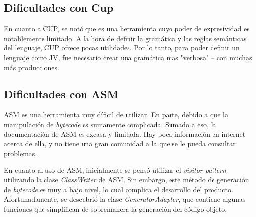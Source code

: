\documentclass{article}
\begin{document}
        \subsection{Dificultades con Cup}
            \par En cuanto a CUP, se notó que es una herramienta cuyo poder de expresividad es notablemente limitado. A la hora de definir la gramática y las reglas semánticas del lenguaje, CUP ofrece pocas utilidades. Por lo tanto, para poder definir un lenguaje como JV, fue necesario crear una gramática mas "verbosa" – con muchas más producciones.

        \subsection{Dificultades con ASM}
            \par ASM es una herramienta muy díficil de utilizar. En parte, debido a que la manipulación de \textit{bytecode} es sumamente complicada. Sumado a eso, la documentación de ASM es excasa y limitada. Hay poca información en internet acerca de ella, y no tiene una gran comunidad a la que se le pueda consultar problemas.
            \par En cuanto al uso de ASM, inicialmente se pensó utilizar el \textit{visitor pattern} utilizando la clase \textit{ClassWriter} de ASM. Sin embargo, este método de generación de \textit{bytecode} es muy a bajo nivel, lo cual complica el desarrollo del producto. Afortunadamente, se descubrió la clase \textit{GeneratorAdapter}, que contiene algunas funciones que simplifican de sobremanera la generación del código objeto.


        \clearpage
\end{document}
